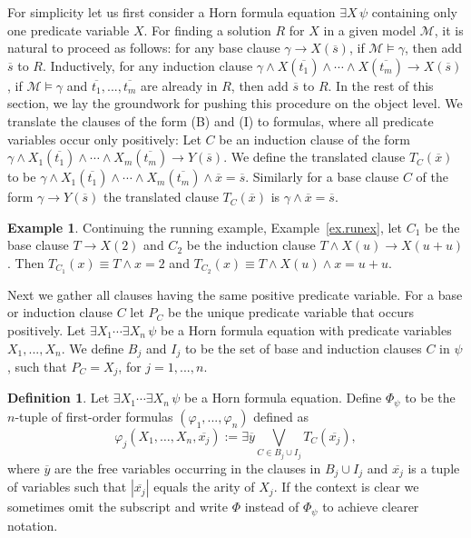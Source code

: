 \documentclass[acmsmall]{acmart}
\theoremstyle{plain}
\theoremstyle{definition}
\newtheorem{definition}[theorem]{Definition}
\newtheorem{example}[theorem]{Example}
\newcommand{\calM}{\mathcal{M}}
\newcommand{\mybar}[1]{\overline{#1}}
\newcommand{\union}{\cup}
\newcommand{\impl}{\rightarrow} %
\newcommand{\Lor}{\bigvee}
\begin{document}
For simplicity let us first consider a Horn formula equation $\exists X\, \psi$ containing
 only one predicate variable $X$.
For finding a solution $R$ for $X$ in a given model $\calM$, it is natural to proceed
 as follows:
for any base clause $\gamma \impl X(\mybar{s})$, if $\calM \models \gamma$, then add
 $\mybar{s}$ to $R$.
Inductively, for any induction clause $\gamma \land X(\mybar{t_1}) \land \cdots \land
 X(\mybar{t_m}) \impl X(\mybar{s})$, if $\calM \models \gamma$ and $\mybar{t_1},...,\mybar{t_m}$ are already in $R$, then add $\mybar{s}$ to $R$.
In the rest of this section, we lay the groundwork for pushing this procedure
 on the object level.
We translate the clauses of the form (B) and (I) to formulas, where all
 predicate variables occur only positively:
Let $C$ be an induction clause of the form $\gamma \land X_{1}(\mybar{t_1}) \land \cdots
 \land X_{m}(\mybar{t_m}) \impl Y(\mybar{s})$.
We define the translated clause $T_C(\mybar{x})$ to be $\gamma \land X_{1}(\mybar{t_1}) \land \cdots \land X_{m}(\mybar{t_m}) \land \mybar{x} = \mybar{s}$.
Similarly for a base clause $C$ of the form $\gamma \impl Y(\mybar{s})$ the translated clause $T_C(\mybar{x})$ is $\gamma \land \mybar{x} = \mybar{s}$.
%
\begin{example}
Continuing the running example, Example~\ref{ex.runex}, let $C_1$ be the base clause $T \impl X(2)$
 and $C_2$ be the induction clause $T\land X(u) \impl X(u+u)$.
Then $T_{C_1}(x) \equiv T\land x = 2$ and $T_{C_2}(x) \equiv T\land X(u) \land x = u + u$.
\end{example}
%
Next we gather all clauses having the same positive predicate variable. For a base or induction clause $C$ let $P_C$ be the unique predicate variable that occurs positively. Let $\exists X_1 \cdots \exists X_n\, \psi$ be a Horn formula equation with predicate variables $X_1,...,X_n$. We define $B_j$ and $I_j$ to be the set of base and induction clauses $C$ in $\psi$, such that $P_C = X_j$, for $j = 1,...,n$.
%
\begin{definition}\label{def.HornformulaSplit}
	Let $\exists X_1 \cdots \exists X_n\, \psi$ be a Horn formula equation.
	Define $\Phi_{\psi}$ to be the $n$-tuple of first-order formulas $(\varphi_1,...,\varphi_n)$ defined as
	\[
	\varphi_j(X_1,\ldots,X_n,\mybar{x_j})
	:=
	\exists \mybar{y} 
	\Lor_{C \in B_j \cup I_j} T_C(\mybar{x_j}), 
	\]
	where $\mybar{y}$ are the free variables occurring in the clauses in $B_j \union I_j$ and $\mybar{x_j}$ is a
	tuple of variables such that $|\mybar{x_j}|$ equals the arity of $X_j$. If the context is clear we sometimes omit the subscript and write $\Phi$ instead of $\Phi_\psi$ to achieve clearer notation.
\end{definition}
\end{document}
